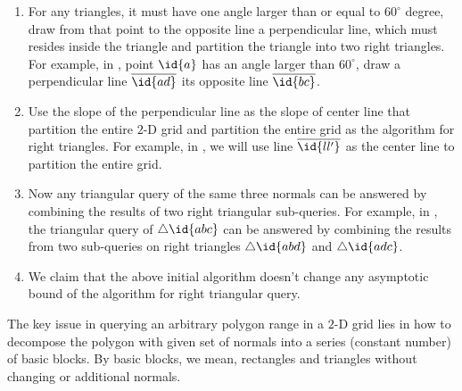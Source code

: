 \begin{enumerate}
\item For any triangles, it must have one angle larger than or equal to
  $60^{\circ}$ degree, draw from that point to the opposite line
  a perpendicular line, which must resides inside the triangle and
  partition the triangle into two right triangles. For example, in
  , point $\id{a}$ has an angle larger
  than $60^{\circ}$, draw a perpendicular line $\overline{\id{ad}}$
  its opposite line $\overline{\id{bc}}$.
\item Use the slope of the perpendicular line as the slope of center
  line that partition the entire $2$-D grid and partition the entire
  grid as the algorithm for right triangles. For example, in
  , we will use line $\overline{\id{ll'}}$
  as the center line to partition the entire grid.
\item Now any triangular query of the same three normals can be answered by
  combining the results of two right triangular sub-queries. For example,
  in , the triangular query of $\triangle
  \id{abc}$ can be answered by combining the results from two sub-queries
  on right triangles $\triangle \id{abd}$ and $\triangle \id{adc}$.
\item We claim that the above initial algorithm doesn't change any 
  asymptotic bound of the algorithm for right triangular query.
\end{enumerate}

The key issue in querying an arbitrary polygon range in a $2$-D grid lies
in how to decompose the polygon with given set of normals into a series
(constant number) of basic blocks. By basic blocks, we mean, rectangles
and triangles without changing or additional normals.

